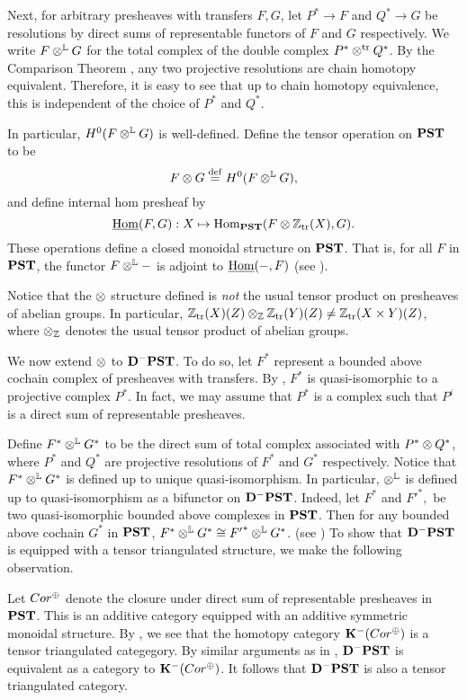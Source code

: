 Next, for arbitrary presheaves with transfers $F, G$, let $P^* \to 
F$ and $Q^* \to G$ be resolutions by direct sums of representable 
functors of $F$ and $G$ respectively. We write $F \tL G$ for the 
total complex of the double complex $P^* \ttr Q^*$. By the 
Comparison Theorem \cite[2.26]{WH}, any two projective resolutions 
are chain homotopy equivalent. Therefore, it is easy to see that 
up to chain homotopy equivalence, this is independent of the 
choice of $P^*$ and $Q^*$.

In particular, $H^0(F \tL G)$ is well-defined. Define the tensor 
operation on $\PST$ to be
\[
F \tensor G \defeq H^0(F \tL G),
\]
and define internal hom presheaf by
\[
\ihom(F, G): X \mapsto \hom_{\PST}(F \tensor \Ztr(X), G).
\]
These operations define a closed monoidal structure on $\PST$.
That is, for all $F$ in $\PST$, the functor $F \tL -$ is adjoint to 
$\ihom(-, F)$ (see \cite[8.3]{MVW}).

\begin{rmk}
Notice that the $\tensor$ structure defined is \emph{not} the
usual tensor product on presheaves of abelian groups. In 
particular, $\Ztr(X)(Z) \tensor_{\Z} \Ztr(Y)(Z) \neq 
\Ztr(X \times Y)(Z)$, where $\tensor_{\Z}$ denotes the usual 
tensor product of abelian groups.
\end{rmk}

We now extend $\tensor$ to $\DCat[D]^-\PST$. To do so, let $F^*$ 
represent a bounded above cochain complex of presheaves with 
transfers. By \cite[10.5.6]{WH}, $F^*$ is quasi-isomorphic to a 
projective complex $P^*$. In fact, we may assume that $P^*$ is a 
complex such that $P^i$ is a direct sum of representable 
presheaves. 

Define $F^* \tL G^*$ to be the direct sum of total complex associated
with $P^* \tensor Q^*$, where $P^*$ and $Q^*$ are projective
resolutions of $F^*$ and $G^*$ respectively. Notice that $F^* \tL G^*$
is defined up to unique quasi-isomorphism. In particular, $\tL$ is 
defined up to quasi-isomorphism as a bifunctor on 
$\DCat[D]^-\PST$. Indeed, let $F^*$ and ${F'}^*,$ be two 
quasi-isomorphic bounded above complexes in $\PST$. Then for any 
bounded above cochain $G^*$ in $\PST$, $F^* \tL G^* \cong {F'}^* \tL G^*$. 
(see \cite[8.7]{MVW}) To show that $\DCat^-\PST$ is equipped
with a tensor triangulated structure, we make the following 
observation.

Let $\Cor^{\oplus}$ denote the closure under direct 
sum of representable presheaves in $\PST$. This is an additive
category equipped with an additive symmetric monoidal structure.
By \cite[8A.4]{MVW}, we see that the homotopy category 
$\DCat[K]^-(\Cor^{\oplus})$ is a tensor triangulated categegory.
By similar arguments as in \cite[10.4.8]{WH}, $\DCat[D]^-\PST$
is equivalent as a category to $\DCat[K]^-(\Cor^{\oplus})$.
It follows that $\DCat[D]^-\PST$ is also a tensor triangulated 
category.

